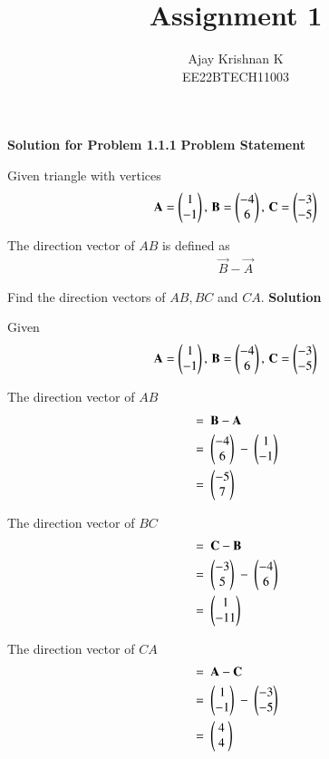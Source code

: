 \documentclass[journal,11pt]{IEEEtran}
\begin{document}
\vspace{3cm}
\author{Ajay Krishnan K\\EE22BTECH11003}

\title{Assignment 1}
\maketitle

\textbf{Solution for Problem 1.1.1}
\bigbreak
\textbf{Problem Statement}

Given triangle with vertices
\begin{align}
    \label{eq:tri-pts}
    \mathbf{A} = \begin{pmatrix} 1 \\ -1 \end{pmatrix},\,
    \mathbf{B} = \begin{pmatrix}-4 \\ 6\end{pmatrix},\,
    \mathbf{C} = \begin{pmatrix}-3 \\ -5\end{pmatrix}
\end{align}

The direction vector of $AB$ is defined as
\begin{align}
    \vec{B}-
    \vec{A}
\end{align}

Find the direction vectors of $AB, BC$ and $CA$.
\bigbreak
\textbf{Solution}

Given
\begin{align}
    \mathbf{A} = \begin{pmatrix}1  \\ -1\end{pmatrix},\,
    \mathbf{B} = \begin{pmatrix}-4 \\ 6\end{pmatrix},\,
    \mathbf{C} = \begin{pmatrix}-3 \\ -5\end{pmatrix}
\end{align}

The direction vector of $AB$
\begin{align}
     & = \ \mathbf{B} - \mathbf{A} \\
     & = \ \begin{pmatrix}-4 \\ 6\end{pmatrix} \ -\ \begin{pmatrix}1 \\ -1\end{pmatrix} \\
     & = \ \begin{pmatrix}-5 \\ 7\end{pmatrix}
\end{align}

The direction vector of $BC$
\begin{align}
     & = \ \mathbf{C} - \mathbf{B} \\
     & = \ \begin{pmatrix}-3 \\ 5\end{pmatrix} \ -\ \begin{pmatrix}-4 \\ 6\end{pmatrix} \\
     & = \ \begin{pmatrix}1  \\ -11\end{pmatrix}
\end{align}

The direction vector of $CA$
\begin{align}
     & = \ \mathbf{A} - \mathbf{C} \\
     & = \ \begin{pmatrix}1   \\ -1\end{pmatrix} \ -\ \begin{pmatrix}-3 \\ -5\end{pmatrix} \\
     & = \ \begin{pmatrix}\ 4 \ \\ \ 4 \ \end{pmatrix}
\end{align}
\end{document}
